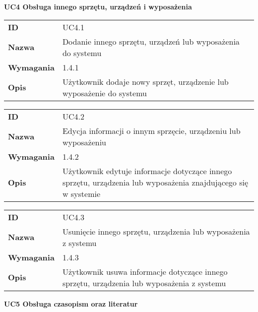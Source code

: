 \vspace{.03\textheight}
\begin{center}
  {\Large\bf UC4 Obsługa innego sprzętu, urządzeń i wyposażenia } \\
\end{center}
\vspace{.02\textheight}

\begin{tabular}{p{}p{}}
\hfill {\bf ID} & UC4.1  \\
\hfill {\bf Nazwa} & Dodanie innego sprzętu, urządzeń lub wyposażenia do systemu \\
\hfill {\bf Wymagania} & 1.4.1 \\
\hfill {\bf Opis} &  Użytkownik dodaje nowy sprzęt, urządzenie lub wyposażenie do systemu \\
\end{tabular}

\vspace{.05\textheight}

\begin{tabular}{p{}p{}}
\hfill {\bf ID} & UC4.2 \\
\hfill {\bf Nazwa} & Edycja informacji o innym sprzęcie, urządzeniu lub wyposażeniu \\
\hfill {\bf Wymagania} & 1.4.2  \\
\hfill {\bf Opis} & Użytkownik edytuje informacje dotyczące innego sprzętu, urządzenia lub wyposażenia znajdującego się w systemie \\
\end{tabular}

\vspace{.05\textheight}

\begin{tabular}{p{}p{}}
\hfill {\bf ID} & UC4.3  \\
\hfill {\bf Nazwa} & Usunięcie innego sprzętu, urządzenia lub wyposażenia z systemu \\
\hfill {\bf Wymagania} & 1.4.3 \\
\hfill {\bf Opis} & Użytkownik usuwa informacje dotyczące innego sprzętu, urządzenia lub wyposażenia z systemu \\
\end{tabular}

\vspace{.03\textheight}
\begin{center}
  {\Large\bf UC5 Obsługa czasopism oraz literatur } \\
\end{center}
\vspace{.02\textheight}

